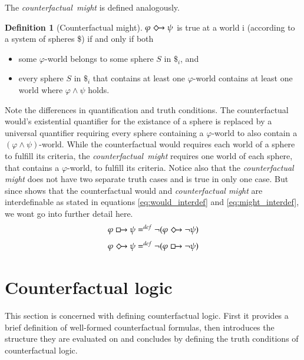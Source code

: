 \documentclass[a4paper,american,10pt]{paper}
\theoremstyle{definition}\newtheorem{lemma}[thm]{Lemma}
\theoremstyle{definition}\newtheorem{proposition}[thm]{Proposition}
\theoremstyle{definition}\newtheorem{corollary}[thm]{Corollary}
\theoremstyle{definition}\newtheorem{definition}{Definition}
\begin{document}
The \textit{counterfactual~might} is defined analogously.

\begin{definition}[Counterfactual might]
	$\varphi\Diamondright\psi$ is true at a world i (according to a system of spheres \$) if and only if both
	\begin{itemize}
	\item[(1)] some $\varphi$-world belongs to some sphere $S$ in $\$_i$, and
	\item[(2)] every sphere $S$ in $\$_i$ that contains at least one $\varphi$-world contains at least one world where $\varphi\wedge\psi$ holds.
	\end{itemize}
	\label{def:counterfactual_might}
\end{definition}

\noindent Note the differences in quantification and truth conditions. The counterfactual would's existential quantifier for the existance of a sphere is replaced by a universal quantifier requiring every sphere containing a $\varphi$-world to also contain a $(\varphi\wedge\psi)$-world. While the counterfactual would requires each world of a sphere to fulfill its criteria, the \textit{counterfactual~might} requires one world of each sphere, that contains a $\varphi$-world, to fulfill its criteria. Notice also that the \textit{counterfactual might} does not have two separate truth cases and is true in only one case. But since \cite{lewis_counterfactuals_1973} shows that the counterfactual would and \textit{counterfactual might} are interdefinable as stated in equations \ref{eq:would_interdef} and \ref{eq:might_interdef}, we wont go into further detail here.
\begin{equation}
\label{eq:would_interdef}
\varphi\boxright\psi =^{def} \neg (\varphi\Diamondright\neg\psi )
\end{equation}
\begin{equation}
\label{eq:might_interdef}
\varphi\Diamondright\psi =^{def} \neg (\varphi\boxright\neg\psi )
\end{equation}

\section{Counterfactual logic}\label{sec:cf_logic}
This section is concerned with defining counterfactual logic. First it provides a brief definition of well-formed counterfactual formulas, then introduces the structure they are evaluated on and concludes by defining the truth conditions of counterfactual logic.
\end{document}
